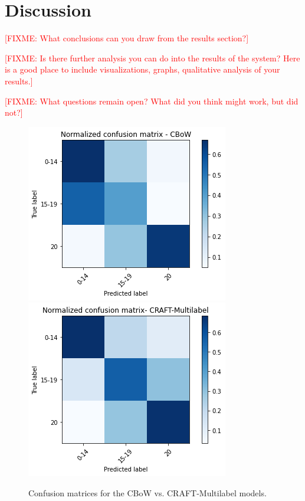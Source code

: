 \documentclass{article}
\newcommand{\fixme}[1]{\textcolor{red}{[FIXME: #1]}}
\begin{document}


\section{Discussion}
\label{sec:discussion}

\fixme{What conclusions can you draw from the results section?}

\fixme{Is there further analysis you can do into the results of the system? Here is a good place to include visualizations, graphs, qualitative analysis of your results.}

\fixme{What questions remain open? What did you think might work, but did not?}

\begin{figure}[t]
  \centering
  \includegraphics[width=0.9\columnwidth]{figs/cm-bow.png}
  \includegraphics[width=0.9\columnwidth]{figs/cm-craftmulti.png}
  \caption{Confusion matrices for the CBoW vs. CRAFT-Multilabel models.}
  \label{fig:confusion-matrices}
\end{figure}
\end{document}

